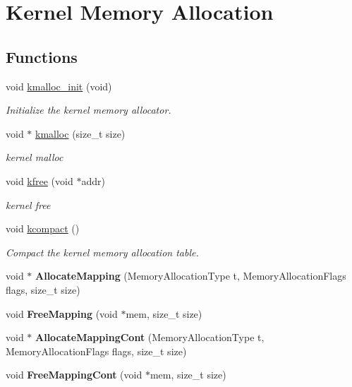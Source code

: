 \hypertarget{group__kmalloc}{}\section{Kernel Memory Allocation}
\label{group__kmalloc}
\subsection*{Functions}
\begin{DoxyCompactItemize}
\item 
void \hyperlink{group__kmalloc_ga63480a95a307ab439fa8d58df704a4ea}{kmalloc\+\_\+init} (void)
\begin{DoxyCompactList}\small\item\em Initialize the kernel memory allocator. \end{DoxyCompactList}\item 
void $\ast$ \hyperlink{group__kmalloc_ga5f52d7c56b7d67dc2f96b2e93dfdc7be}{kmalloc} (size\+\_\+t size)
\begin{DoxyCompactList}\small\item\em kernel malloc \end{DoxyCompactList}\item 
void \hyperlink{group__kmalloc_gaa3ff6401026972fc396bda649a01c994}{kfree} (void $\ast$addr)
\begin{DoxyCompactList}\small\item\em kernel free \end{DoxyCompactList}\item 
void \hyperlink{group__kmalloc_ga2e55df57a359c2d24eb9b17f814fec51}{kcompact} ()
\begin{DoxyCompactList}\small\item\em Compact the kernel memory allocation table. \end{DoxyCompactList}\item 
void $\ast$ {\bfseries Allocate\+Mapping} (Memory\+Allocation\+Type t, Memory\+Allocation\+Flags flags, size\+\_\+t size)\hypertarget{group__kmalloc_ga79179bdfc6debb042bef75ee2a22379b}{}\label{group__kmalloc_ga79179bdfc6debb042bef75ee2a22379b}

\item 
void {\bfseries Free\+Mapping} (void $\ast$mem, size\+\_\+t size)\hypertarget{group__kmalloc_ga368fbc2594a88e98201cea587eae41ff}{}\label{group__kmalloc_ga368fbc2594a88e98201cea587eae41ff}

\item 
void $\ast$ {\bfseries Allocate\+Mapping\+Cont} (Memory\+Allocation\+Type t, Memory\+Allocation\+Flags flags, size\+\_\+t size)\hypertarget{group__kmalloc_gad8725ae2fe0d7278f553394c29e9c676}{}\label{group__kmalloc_gad8725ae2fe0d7278f553394c29e9c676}

\item 
void {\bfseries Free\+Mapping\+Cont} (void $\ast$mem, size\+\_\+t size)\hypertarget{group__kmalloc_gad4a1cc99e14f148bf2d0777a331c3976}{}\label{group__kmalloc_gad4a1cc99e14f148bf2d0777a331c3976}

\end{DoxyCompactItemize}



